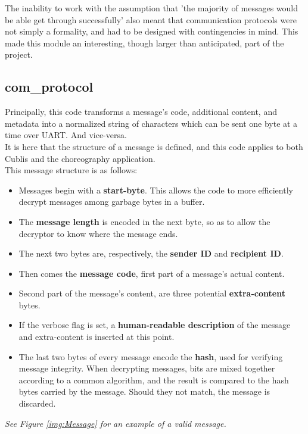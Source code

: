 The inability to work with the assumption that 'the majority of messages would be able get through successfully' also meant that communication protocols were not simply a formality, and had to be designed with contingencies in mind. This made this module an interesting, though larger than anticipated, part of the project.

\subsection{com\_protocol}

Principally, this code transforms a message's code, additional content, and metadata into a normalized string of characters which can be sent one byte at a time over UART. And vice-versa.\\

It is here that the structure of a message is defined, and this code applies to both Cublis and the choreography application.\\

This message structure is as follows:
\begin{itemize}
\item[] Messages begin with a \textbf{start-byte}. This allows the code to more efficiently decrypt messages among garbage bytes in a buffer.
\item[] The \textbf{message length} is encoded in the next byte, so as to allow the decryptor to know where the message ends.
\item[] The next two bytes are, respectively, the \textbf{sender ID} and \textbf{recipient ID}.
\item[] Then comes the \textbf{message code}, first part of a message's actual content.
\item[] Second part of the message's content, are three potential \textbf{extra-content} bytes.
\item[] If the verbose flag is set, a \textbf{human-readable description} of the message and extra-content is inserted at this point.
\item[] The last two bytes of every message encode the \textbf{hash}, used for verifying message integrity. When decrypting messages, bits are mixed together according to a common algorithm, and the result is compared to the hash bytes carried by the message. Should they not match, the message is discarded.
\end{itemize}

\textit{See Figure \ref{img:Message} for an example of a valid message.}\\


